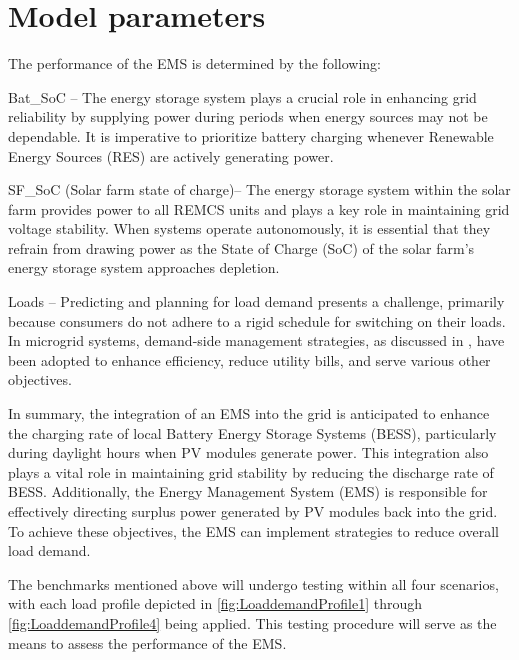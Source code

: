 \section{Model parameters}
The performance of the EMS is determined by the following:\par
Bat\_SoC – The energy storage system plays a crucial role in enhancing grid reliability by supplying power during periods when energy sources may not be dependable. It is imperative to prioritize battery charging whenever Renewable Energy Sources (RES) are actively generating power.\par
SF\_SoC (Solar farm state of charge)– The energy storage system within the solar farm provides power to all REMCS units and plays a key role in maintaining grid voltage stability. When systems operate autonomously, it is essential that they refrain from drawing power as the State of Charge (SoC) of the solar farm's energy storage system approaches depletion.\par
Loads – Predicting and planning for load demand presents a challenge, primarily because consumers do not adhere to a rigid schedule for switching on their loads. In microgrid systems, demand-side management strategies, as discussed in \cite{Mota2022}, have been adopted to enhance efficiency, reduce utility bills, and serve various other objectives.\par
In summary, the integration of an EMS into the grid is anticipated to enhance the charging rate of local Battery Energy Storage Systems (BESS), particularly during daylight hours when PV modules generate power. This integration also plays a vital role in maintaining grid stability by reducing the discharge rate of BESS. Additionally, the Energy Management System (EMS) is responsible for effectively directing surplus power generated by PV modules back into the grid. To achieve these objectives, the EMS can implement strategies to reduce overall load demand.\par
The benchmarks mentioned above will undergo testing within all four scenarios, with each load profile depicted in \autoref{fig:LoaddemandProfile1} through \autoref{fig:LoaddemandProfile4} being applied. This testing procedure will serve as the means to assess the performance of the EMS.
